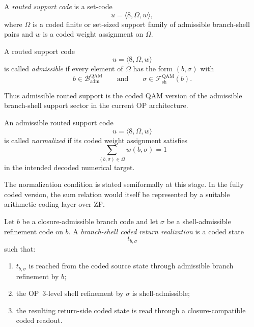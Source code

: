 \begin{definition}
A \emph{routed support code} is a set-code
\[
u=\langle 8,\Omega,w\rangle,
\]
where $\Omega$ is a coded finite or set-sized support family of admissible branch-shell pairs and $w$ is a coded weight assignment on $\Omega$.
\end{definition}

\begin{definition}
A routed support code
\[
u=\langle 8,\Omega,w\rangle
\]
is called \emph{admissible} if every element of $\Omega$ has the form $(b,\sigma)$ with
\[
b\in \mathcal{B}^{\mathrm{QAM}}_{\mathrm{adm}}
\qquad\text{and}\qquad
\sigma\in \mathcal{F}^{\mathrm{QAM}}_{\mathrm{sh}}(b).
\]
\end{definition}

\begin{remark}
Thus admissible routed support is the coded QAM version of the admissible branch-shell support sector in the current OP architecture.
\end{remark}

\begin{definition}
An admissible routed support code
\[
u=\langle 8,\Omega,w\rangle
\]
is called \emph{normalized} if its coded weight assignment satisfies
\[
\sum_{(b,\sigma)\in\Omega} w(b,\sigma)=1
\]
in the intended decoded numerical target.
\end{definition}

\begin{remark}
The normalization condition is stated semiformally at this stage. In the fully coded version, the sum relation would itself be represented by a suitable arithmetic coding layer over ZF.
\end{remark}

\begin{definition}
Let $b$ be a closure-admissible branch code and let $\sigma$ be a shell-admissible refinement code on $b$. A \emph{branch-shell coded return realization} is a coded state
\[
t_{b,\sigma}
\]
such that:
\begin{enumerate}
\item $t_{b,\sigma}$ is reached from the coded source state through admissible branch refinement by $b$;
\item the OP~3-level shell refinement by $\sigma$ is shell-admissible;
\item the resulting return-side coded state is read through a closure-compatible coded readout.
\end{enumerate}
\end{definition}

